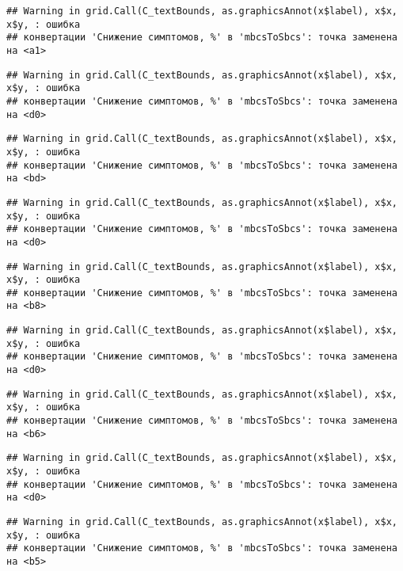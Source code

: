 \documentclass[
]{article}
\begin{document}
\begin{verbatim}
## Warning in grid.Call(C_textBounds, as.graphicsAnnot(x$label), x$x, x$y, : ошибка
## конвертации 'Снижение симптомов, %' в 'mbcsToSbcs': точка заменена на <a1>
\end{verbatim}

\begin{verbatim}
## Warning in grid.Call(C_textBounds, as.graphicsAnnot(x$label), x$x, x$y, : ошибка
## конвертации 'Снижение симптомов, %' в 'mbcsToSbcs': точка заменена на <d0>
\end{verbatim}

\begin{verbatim}
## Warning in grid.Call(C_textBounds, as.graphicsAnnot(x$label), x$x, x$y, : ошибка
## конвертации 'Снижение симптомов, %' в 'mbcsToSbcs': точка заменена на <bd>
\end{verbatim}

\begin{verbatim}
## Warning in grid.Call(C_textBounds, as.graphicsAnnot(x$label), x$x, x$y, : ошибка
## конвертации 'Снижение симптомов, %' в 'mbcsToSbcs': точка заменена на <d0>
\end{verbatim}

\begin{verbatim}
## Warning in grid.Call(C_textBounds, as.graphicsAnnot(x$label), x$x, x$y, : ошибка
## конвертации 'Снижение симптомов, %' в 'mbcsToSbcs': точка заменена на <b8>
\end{verbatim}

\begin{verbatim}
## Warning in grid.Call(C_textBounds, as.graphicsAnnot(x$label), x$x, x$y, : ошибка
## конвертации 'Снижение симптомов, %' в 'mbcsToSbcs': точка заменена на <d0>
\end{verbatim}

\begin{verbatim}
## Warning in grid.Call(C_textBounds, as.graphicsAnnot(x$label), x$x, x$y, : ошибка
## конвертации 'Снижение симптомов, %' в 'mbcsToSbcs': точка заменена на <b6>
\end{verbatim}

\begin{verbatim}
## Warning in grid.Call(C_textBounds, as.graphicsAnnot(x$label), x$x, x$y, : ошибка
## конвертации 'Снижение симптомов, %' в 'mbcsToSbcs': точка заменена на <d0>
\end{verbatim}

\begin{verbatim}
## Warning in grid.Call(C_textBounds, as.graphicsAnnot(x$label), x$x, x$y, : ошибка
## конвертации 'Снижение симптомов, %' в 'mbcsToSbcs': точка заменена на <b5>
\end{verbatim}
\end{document}
